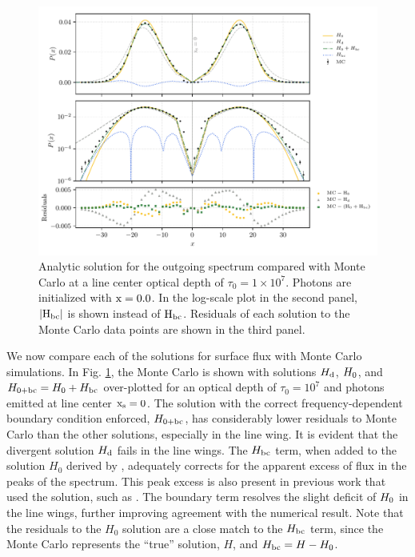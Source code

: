 \documentclass{aastex63}
\begin{document}
\begin{figure}
    \centering
    \includegraphics{final_residual.pdf}
    \caption{Analytic solution for the outgoing spectrum compared with Monte Carlo at a line center optical depth of $\tau_0 = 1 \times 10^7$. Photons are initialized with $\rm x = 0.0$. In the log-scale plot in the second panel, $|\rm H_{bc}|$ is shown instead of $\rm H_{bc}$. Residuals of each solution to the Monte Carlo data points are shown in the third panel.} 
    \label{fig:sol_mc_residual_0}
\end{figure}

We now compare each of the solutions for surface flux with Monte Carlo simulations. In Fig. \ref{fig:sol_mc_residual_0}, the Monte Carlo is shown with solutions $H_{\rm d}$, $H_{\rm 0}$, and $H_{\rm 0 + bc} = H_{\rm 0} + H_{\rm bc}$ over-plotted for an optical depth of $\tau_0 = 10^7$ and photons emitted at line center $\rm x_s = 0$. The solution with the correct frequency-dependent boundary condition enforced, $H_{\rm 0 + bc}$, has considerably lower residuals to Monte Carlo than the other solutions, especially in the line wing. It is evident that the divergent solution $H_{\rm d}$ fails in the line wings. The $H_{\rm bc}$ term, when added to the solution $H_0$ derived by \citet{2006ApJ...649...14D}, adequately corrects for the apparent excess of flux in the peaks of the spectrum. This peak excess is also present in previous work that used the \citet{1990ApJ...350..216N} solution, such as \citet{2015MNRAS.449.4336S}. The boundary term resolves the slight deficit of $H_{\rm0}$ in the line wings, further improving agreement with the numerical result. Note that the residuals to the $H_0$ solution are a close match to the $H_{\rm bc}$ term, since the Monte Carlo represents the ``true'' solution, $H$, and $H_{\rm bc} = H - H_0$. 
 
\end{document}

